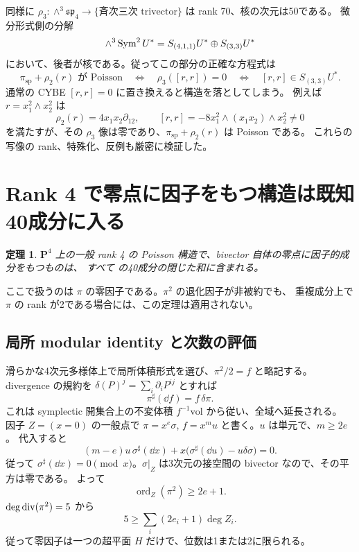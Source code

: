 \documentclass[11pt,a4paper]{ltjsarticle}
\newcommand{\PP}{\mathbf P}\renewcommand{\AA}{\mathbf A}\newcommand{\CC}{\mathbf C}\newcommand{\QQ}{\mathbf Q}
\newtheorem{theorem}{定理}[section]\newtheorem{proposition}[theorem]{命題}\newtheorem{lemma}[theorem]{補題}\newtheorem{corollary}[theorem]{系}
\theoremstyle{remark}\newtheorem{remark}[theorem]{注意}\renewcommand{\proofname}{証明}
\begin{document}
同様に $\rho_3:\wedge^3\mathfrak{sp}_4\to\{\text{斉次三次 trivector}\}$ は rank 70、核の次元は50である。
微分形式側の分解
\[
 \wedge^3\operatorname{Sym}^2U^*=S_{(4,1,1)}U^*\oplus S_{(3,3)}U^*
\]
において、後者が核である。従ってこの部分の正確な方程式は
\[
 \pi_{\mathrm{sp}}+\rho_2(r)\text{ が Poisson}
 \quad\Longleftrightarrow\quad
 \rho_3([r,r])=0
 \quad\Longleftrightarrow\quad
 [r,r]\in S_{(3,3)}U^*.
\]
通常の CYBE $[r,r]=0$ に置き換えると構造を落としてしまう。
例えば $r=x_1^2\wedge x_2^2$ は
\[
 \rho_2(r)=4x_1x_2\partial_{12},\qquad
 [r,r]=-8x_1^2\wedge(x_1x_2)\wedge x_2^2\ne0
\]
を満たすが、その $\rho_3$ 像は零であり、$\pi_{\mathrm{sp}}+\rho_2(r)$ は Poisson である。
これらの写像の rank、特殊化、反例も厳密に検証した。

\section{Rank 4 で零点に因子をもつ構造は既知40成分に入る}
\begin{theorem}\label{thm:divzero}
$\PP^4$ 上の一般 rank 4 の Poisson 構造で、bivector 自体の零点に因子的成分をもつものは、
すべて \cite[Theorem 1.4]{MPS} の40成分の閉じた和に含まれる。
\end{theorem}

ここで扱うのは $\pi$ の零因子である。$\pi^2$ の退化因子が非被約でも、
重複成分上で $\pi$ の rank が2である場合には、この定理は適用されない。

\subsection{局所 modular identity と次数の評価}
滑らかな4次元多様体上で局所体積形式を選び、$\pi^2/2=f$ と略記する。
divergence の規約を $\delta(P)^j=\sum_i\partial_iP^{ij}$ とすれば
\[
 \pi^\sharp(\dd f)=f\,\delta\pi.
\]
これは symplectic 開集合上の不変体積 $f^{-1}\mathrm{vol}$ から従い、全域へ延長される。
因子 $Z=(x=0)$ の一般点で $\pi=x^e\sigma$, $f=x^m u$ と書く。$u$ は単元で、$m\ge2e$。
代入すると
\[
 (m-e)u\,\sigma^\sharp(\dd x)
 +x\bigl(\sigma^\sharp(\dd u)-u\delta\sigma\bigr)=0.
\]
従って $\sigma^\sharp(\dd x)=0\pmod x$。$\sigma|_Z$ は3次元の接空間の bivector なので、その平方は零である。
よって
\[
 \operatorname{ord}_Z(\pi^2)\ge2e+1.
\]
$\deg\operatorname{div}(\pi^2)=5$ から
\[
 5\ge\sum_i(2e_i+1)\deg Z_i.
\]
従って零因子は一つの超平面 $H$ だけで、位数は1または2に限られる。
\end{document}
